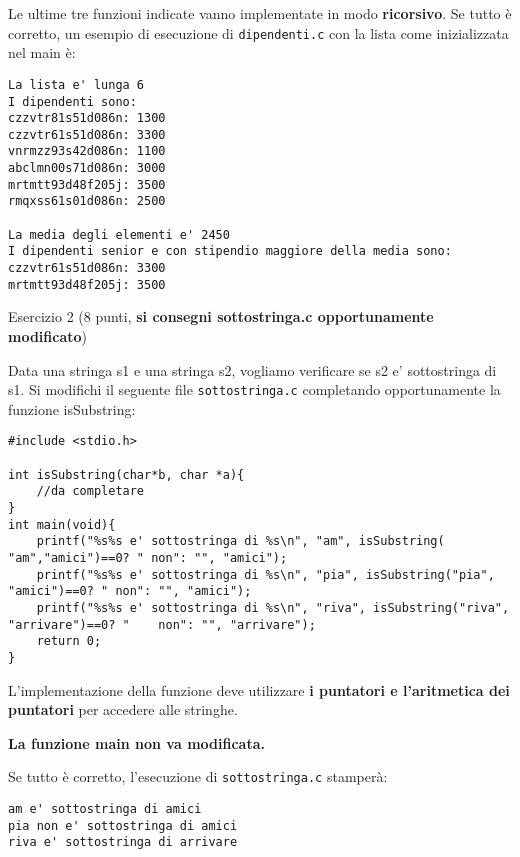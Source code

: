 \documentclass[12pt]{article}
\begin{document}
Le ultime tre funzioni indicate vanno implementate in modo \textbf{ricorsivo}.
Se tutto \`e corretto, un esempio di esecuzione di \texttt{dipendenti.c} con la lista come inizializzata nel main \`e:
%
\begin{mdframed}[backgroundcolor=verylightgray] 
\begin{verbatim}
La lista e' lunga 6
I dipendenti sono:
czzvtr81s51d086n: 1300
czzvtr61s51d086n: 3300
vnrmzz93s42d086n: 1100
abclmn00s71d086n: 3000
mrtmtt93d48f205j: 3500
rmqxss61s01d086n: 2500

La media degli elementi e' 2450
I dipendenti senior e con stipendio maggiore della media sono:
czzvtr61s51d086n: 3300
mrtmtt93d48f205j: 3500
\end{verbatim}
\end{mdframed}

\begin{center}Esercizio 2 ($8$ punti, \textbf{si consegni {sottostringa.c} opportunamente modificato})
\end{center}

Data una stringa s1 e una stringa s2, vogliamo verificare se s2 e' sottostringa di s1.
%
Si modifichi il seguente file \texttt{sottostringa.c} completando opportunamente la funzione isSubstring:

\begin{lstlisting}[language=myC]
#include <stdio.h>

int isSubstring(char*b, char *a){
	//da completare
}
int main(void){
	printf("%s%s e' sottostringa di %s\n", "am", isSubstring( "am","amici")==0? " non": "", "amici");
	printf("%s%s e' sottostringa di %s\n", "pia", isSubstring("pia", "amici")==0? " non": "", "amici");
	printf("%s%s e' sottostringa di %s\n", "riva", isSubstring("riva", "arrivare")==0? " 	non": "", "arrivare");
	return 0;
}

\end{lstlisting}
L'implementazione della funzione deve utilizzare \textbf{i puntatori e l'aritmetica dei puntatori} per accedere alle stringhe.
\begin{mdframed}[backgroundcolor=myLightBlue] 
  \vspace*{-0.5ex}
  \textbf{La funzione main non va modificata.}
\end{mdframed}
%
Se tutto \`e corretto, l'esecuzione di \texttt{sottostringa.c} stamperà:

%
\begin{mdframed}[backgroundcolor=verylightgray] 
\begin{verbatim}
am e' sottostringa di amici
pia non e' sottostringa di amici
riva e' sottostringa di arrivare
\end{verbatim}
\end{mdframed}

	
	
	
\end{document}
